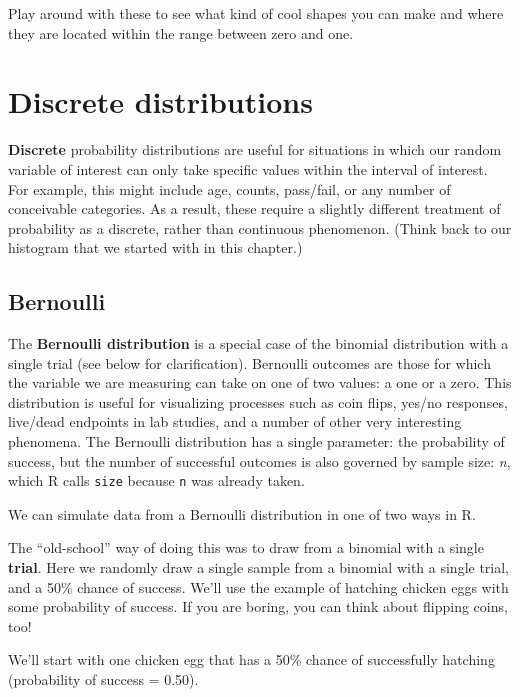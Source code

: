 \documentclass[
]{book}
\begin{document}
Play around with these to see what kind of cool shapes you can make and where they are located within the range between zero and one.

\hypertarget{discrete-distributions}{%
\section{Discrete distributions}\label{discrete-distributions}}

\textbf{Discrete} probability distributions are useful for situations in which our random variable of interest can only take specific values within the interval of interest. For example, this might include age, counts, pass/fail, or any number of conceivable categories. As a result, these require a slightly different treatment of probability as a discrete, rather than continuous phenomenon. (Think back to our histogram that we started with in this chapter.)

\hypertarget{bernoulli}{%
\subsection{Bernoulli}\label{bernoulli}}

The \textbf{Bernoulli distribution} is a special case of the binomial distribution with a single trial (see below for clarification). Bernoulli outcomes are those for which the variable we are measuring can take on one of two values: a one or a zero. This distribution is useful for visualizing processes such as coin flips, yes/no responses, live/dead endpoints in lab studies, and a number of other very interesting phenomena. The Bernoulli distribution has a single parameter: the probability of success, but the number of successful outcomes is also governed by sample size: \emph{n}, which R calls \texttt{size} because \texttt{n} was already taken.

We can simulate data from a Bernoulli distribution in one of two ways in R.

The ``old-school'' way of doing this was to draw from a binomial with a single \textbf{trial}. Here we randomly draw a single sample from a binomial with a single trial, and a 50\% chance of success. We'll use the example of hatching chicken eggs with some probability of success. If you are boring, you can think about flipping coins, too!

We'll start with one chicken egg that has a 50\% chance of successfully hatching (probability of success = 0.50).
\end{document}

